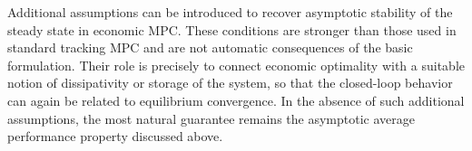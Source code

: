 Additional assumptions can be introduced to recover asymptotic stability of the steady state in economic MPC. These conditions are stronger than those used in standard tracking MPC and are not automatic consequences of the basic formulation. Their role is precisely to connect economic optimality with a suitable notion of dissipativity or storage of the system, so that the closed-loop behavior can again be related to equilibrium convergence. In the absence of such additional assumptions, the most natural guarantee remains the asymptotic average performance property discussed above.